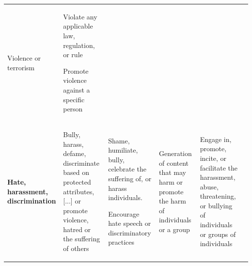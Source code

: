 {\begin{longtable}{p{6em}p{6em}p{6em}p{6em}p{6em}p{6em}}
\begin{balditemize}[noitemsep, topsep=0pt]
   	\item Violence or terrorism
   \end{balditemize}
   &
   \begin{balditemize}[noitemsep, topsep=0pt]
   	\item Violate any applicable law, regulation, or rule
   	\item Promote violence against a specific person
   \end{balditemize}
\\
   \begin{balditemize}[noitemsep, topsep=0pt]
   	\item \textbf{Hate, harassment, discrimination}
   \end{balditemize}  &
\begin{balditemize}[noitemsep, topsep=0pt]
	\item Bully, harass, defame, discriminate based on protected attributes, {[}...{]} or promote violence, hatred or the suffering of others
\end{balditemize} &
\begin{balditemize}[noitemsep, topsep=0pt]
	\item Shame, humiliate, bully, celebrate the suffering of, or harass individuals.
	\item Encourage hate speech or discriminatory practices
\end{balditemize} &
\begin{balditemize}[noitemsep, topsep=0pt]
	\item Generation of content that may harm or promote the harm of individuals or a group
	\end{balditemize} &
\begin{balditemize}[noitemsep, topsep=0pt]
	\item Engage in, promote, incite, or facilitate the harassment, abuse, threatening, or bullying of individuals or groups of individuals


\end{balditemize}
\end{longtable}}
